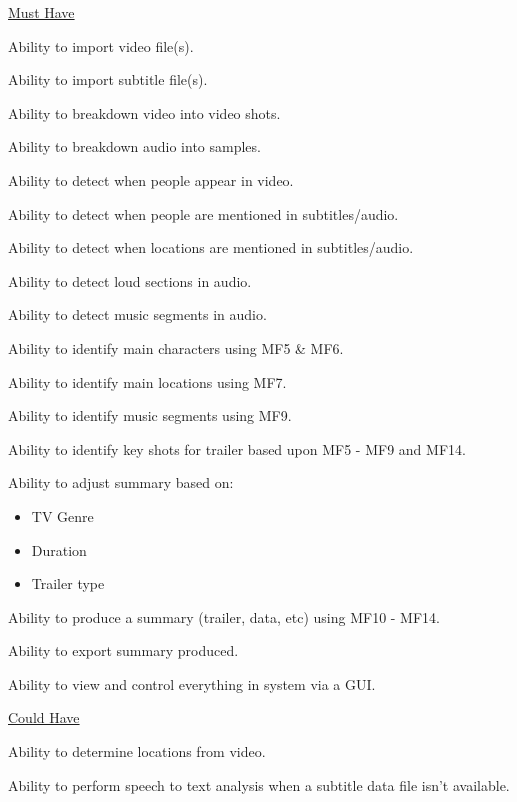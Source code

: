 	\underline{Must Have}
		\begin{list}{     MF:   ~}{}
			\item{Ability to import video file(s).}
			\item{Ability to import subtitle file(s).}
			\item{Ability to breakdown video into video shots.}
			\item{Ability to breakdown audio into samples.}
			\item{Ability to detect when people appear in video.}
			\item{Ability to detect when people are mentioned in subtitles/audio.}
			\item{Ability to detect when locations are mentioned in subtitles/audio.}
			\item{Ability to detect loud sections in audio.}
			\item{Ability to detect music segments in audio.}
			\item{Ability to identify main characters using MF5 \& MF6.}
			\item{Ability to identify main locations using MF7.}
			\item{Ability to identify music segments using MF9.}
			\item{Ability to identify key shots for trailer based upon MF5 - MF9 and MF14.}
			\item{Ability to adjust summary based on:}
			\begin{itemize}
					\item{TV Genre}
					\item{Duration}
					\item{Trailer type}
			\end{itemize}
			\item{Ability to produce a summary (trailer, data, etc) using MF10 - MF14.}
			\item{Ability to export summary produced.}
			\item{Ability to view and control everything in system via a GUI.}
	\end{list}

	\underline{Could Have}
		\begin{list}{     CF:   ~}{}
			\item{Ability to determine locations from video.}
			\item{Ability to perform speech to text analysis when a subtitle data file isn't available.}
		\end{list}
\newpage
